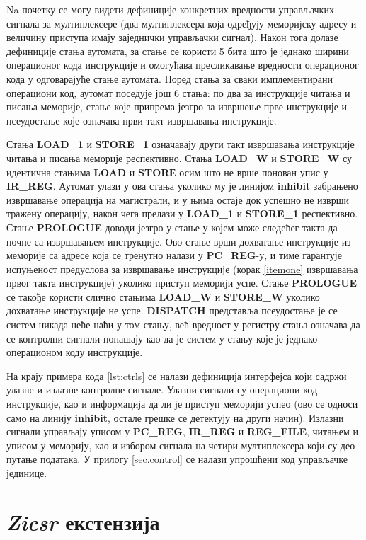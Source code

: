 Na почетку се могу видети дефиниције конкретних вредности управљачких сигнала за мултиплексере (два мултиплексера која одређују меморијску адресу и величину приступа имају заједнички управљачки сигнал). Након тога долазе дефиниције стања аутомата, за стање се користи 5 бита што је једнако ширини операционог кода инструкције и омогућава пресликавање вредности операционог кода у одговарајуће стање аутомата. Поред стања за сваки имплементирани операциони код, аутомат поседује још 6 стања: по два за инструкције читања и писања меморије, стање које припрема језгро за извршење прве инструкције и псеудостање које означава први такт извршавања инструкције.

Стања \textbf{LOAD\_1} и \textbf{STORE\_1} означавају други такт извршавања инструкције читања и писања меморије респективно. Стања \textbf{LOAD\_W} и \textbf{STORE\_W} су идентична стањима \textbf{LOAD} и \textbf{STORЕ} осим што не врше понован упис у \textbf{IR\_REG}. Аутомат улази у ова стања уколико му је линијом \textbf{inhibit} забрањено извршавање операција на магистрали, и у њима остаје док успешно не изврши тражену операцију, након чега прелази у \textbf{LOAD\_1} и \textbf{STORE\_1} респективно.
Стање \textbf{PROLOGUE} доводи језгро у стање у којем може следећег такта да почне са извршавањем инструкције. Ово стање врши дохватање инструкције из меморије са адресе која се тренутно налази у \textbf{PC\_REG}-у, и тиме гарантује испуњеност предуслова за извршавање инструкције (корак \ref{itemone} извршавања првог такта инструкције) уколико приступ меморији успе. Стање \textbf{PROLOGUE} се такође користи слично стањима \textbf{LOAD\_W} и \textbf{STORE\_W} уколико дохватање инструкције не успе. \textbf{DISPATCH} представља псеудостање је се систем никада неће наћи у том стању, већ вредност у регистру стања означава да се контролни сигнали понашају као да је систем у стању које је једнако операционом коду инструкције.

На крају примера кода \ref{lst:ctrls} се налази дефиниција интерфејса који садржи улазне и излазне контролне сигнале. Улазни сигнали су операциони код инструкције, као и информација да ли је приступ меморији успео (ово се односи само на линију \textbf{inhibit}, остале грешке се детектују на други начин). Излазни сигнали управљају уписом у \textbf{PC\_REG}, \textbf{IR\_REG} и \textbf{REG\_FILE}, читањем и уписом у меморију, као и избором сигнала на четири мултиплексера који су део путање података. У прилогу \ref{sec.control} се налази упрошћени код управљачке јединице.

\section{\textit{Zicsr} екстензија}


